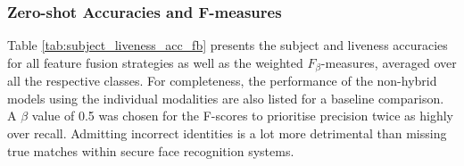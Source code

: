 \documentclass{mpaper}
\begin{document}
\subsubsection{Zero-shot Accuracies and F-measures}
Table \ref{tab:subject_liveness_acc_fb} presents the subject and liveness accuracies for all feature fusion strategies as well as the weighted $F_{\beta}$-measures, averaged over all the respective classes. For completeness, the performance of the non-hybrid models using the individual modalities are also listed for a baseline comparison. A $\beta$ value of 0.5 was chosen for the F-scores to prioritise precision twice as highly over recall. Admitting incorrect identities is a lot more detrimental than missing true matches within secure face recognition systems.

\begin{table}[htbp]
    \centering
    \vspace{0.1cm}
    \caption{Subject and liveness accuracies and weighted-averaged $F_{0.5}$ measures for the seven feature fusion strategies along with the individual modalities.}
    \label{tab:subject_liveness_acc_fb}
    \vspace{-0.1cm}
\end{table}
\end{document}
